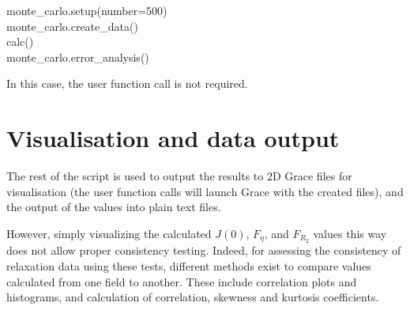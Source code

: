 \begin{exampleenv}
monte\_carlo.setup(number=500) \\
monte\_carlo.create\_data() \\
calc() \\
monte\_carlo.error\_analysis()
\end{exampleenv}

In this case, the  user function call is not required.



\section{Visualisation and data output}

The rest of the script is used to output the results to 2D Grace files for visualisation (the  user function calls will launch Grace with the created files), and the output of the values into plain text files.

However, simply visualizing the calculated $J(0)$, $F_\eta$, and $F_{R_2}$ values this way does not allow proper consistency testing. Indeed, for assessing the consistency of relaxation data using these tests, different methods exist to compare values calculated from one field to another.  These include correlation plots and histograms, and calculation of correlation, skewness and kurtosis coefficients.


